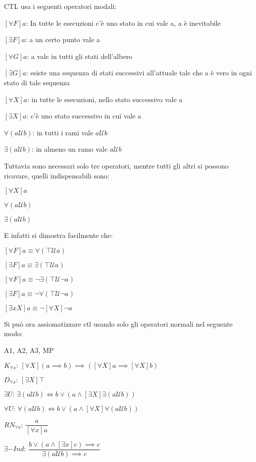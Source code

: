 CTL usa i seguenti operatori modali:

$[\forall F]a$: In tutte le esecuzioni c'è uno stato in cui vale
a, a è inevitabile

$[\exists F]a$: a un certo punto vale a

$[\forall G]a$: a vale in tutti gli stati dell'albero

$[\exists G]a$: esiste una sequenza di stati successivi all'attuale
tale che a è vero in ogni stato di tale sequenza

$[\forall X]a$: in tutte le esecuzioni, nello stato successivo vale
a

$[\exists X]a$: c'è uno stato successivo in cui vale a

$\forall(a\mathcal{U}b)$: in tutti i rami vale $a\mathcal{U}b$

$\exists(a\mathcal{U}b)$: in almeno un ramo vale $a\mathcal{U}b$

Tuttavia sono necessari solo tre operatori, mentre tutti gli altri
si possono ricavare, quelli indispensabili sono:

$[\forall X]a$

$\forall(a\mathcal{U}b)$

$\exists(a\mathcal{U}b)$

E infatti si dimostra facilmente che:

$[\forall F]a\equiv\forall(\top\mathcal{U}a)$

$[\exists F]a\equiv\exists(\top\mathcal{U}a)$

$[\forall F]a\equiv\neg\exists(\top\mathcal{U\neg}a)$

$[\exists F]a\equiv\neg\forall(\top\mathcal{U\neg}a)$

$[\exists xX]a\equiv\neg[\forall X]\neg a$

Si può ora assiomatizzare ctl usando solo gli operatori normali nel
seguente modo:

A1, A2, A3, MP

$K_{\forall x}:\,[\forall X](a\implies b)\implies([\forall X]a\implies[\forall X]b)$

$D_{\forall x}:\,[\exists X]\top$

$\exists U:\,\exists(a\mathcal{U}b)\iff b\vee(a\wedge[\exists X]\exists(a\mathcal{U}b))$

$\forall U:\,\forall(a\mathcal{U}b)\iff b\vee(a\wedge[\forall X]\forall(a\mathcal{U}b))$

$RN_{\forall x}:\,\dfrac{a}{[\forall x]a}$

$\exists-Ind:\,\dfrac{b\vee(a\wedge[\exists x]c)\implies c}{\exists(a\mathcal{U}b)\implies c}$

